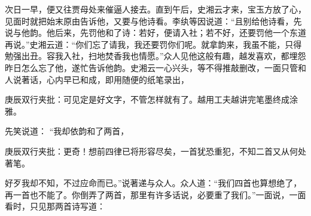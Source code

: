 \begin{parag}
    次日一早，便又往贾母处来催逼人接去。直到午后，史湘云才来，宝玉方放了心，见面时就把始末原由告诉他，又要与他诗看。李纨等因说道：“且别给他诗看，先说与他韵。他后来，先罚他和了诗：若好，便请入社；若不好，还要罚他一个东道再说。”史湘云道：“你们忘了请我，我还要罚你们呢。就拿韵来，我虽不能，只得勉强出丑。容我入社，扫地焚香我也情愿。”众人见他这般有趣，越发喜欢，都埋怨昨日怎么忘了他，遂忙告诉他韵。史湘云一心兴头，等不得推敲删改，一面只管和人说著话，心内早已和成，即用随便的纸笔录出，\begin{note}庚辰双行夹批：可见定是好文字，不管怎样就有了。越用工夫越讲完笔墨终成涂雅。\end{note}先笑说道： “我却依韵和了两首，\begin{note}庚辰双行夹批：更奇！想前四律已将形容尽矣，一首犹恐重犯，不知二首又从何处著笔。\end{note}好歹我却不知，不过应命而已。”说著递与众人。众人道：“我们四首也算想绝了，再一首也不能了。你倒弄了两首，那里有许多话说，必要重了我们。”一面说，一面看时，只见那两首诗写道：
\end{parag}


